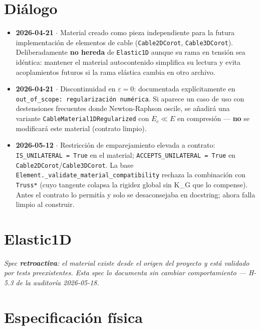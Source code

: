 \documentclass[11pt,letterpaper,oneside]{report}
\begin{document}
\section{Diálogo}

\begin{itemize}
  \item \textbf{2026-04-21} \ensuremath{\cdot} Material creado como pieza independiente para la futura implementación de elementos de cable (\texttt{Cable2DCorot}, \texttt{Cable3DCorot}). Deliberadamente \textbf{no hereda} de \texttt{Elastic1D} aunque su rama en tensión sea idéntica: mantener el material autocontenido simplifica su lectura y evita acoplamientos futuros si la rama elástica cambia en otro archivo.
  \item \textbf{2026-04-21} \ensuremath{\cdot} Discontinuidad en $\varepsilon = 0$: documentada explícitamente en \texttt{out\_of\_scope: regularización numérica}. Si aparece un caso de uso con destensiones frecuentes donde Newton-Raphson oscile, se añadirá una variante \texttt{CableMaterial1DRegularized} con $E_c \ll E$ en compresión --- \textbf{no} se modificará este material (contrato limpio).
  \item \textbf{2026-05-12} \ensuremath{\cdot} Restricción de emparejamiento elevada a contrato: \texttt{IS\_UNILATERAL = True} en el material; \texttt{ACCEPTS\_UNILATERAL = True} en \texttt{Cable2DCorot}/\texttt{Cable3DCorot}. La base \texttt{Element.\_validate\_material\_compatibility} rechaza la combinación con \texttt{Truss*} (cuyo tangente colapsa la rigidez global sin K\_G que lo compense). Antes el contrato lo permitía y solo se desaconsejaba en docstring; ahora falla limpio al construir.
\end{itemize}


\newpage

\section{Elastic1D}



\textit{Spec \textbf{retroactiva}: el material existe desde el origen del proyecto y está validado por tests preexistentes. Esta spec lo documenta sin cambiar comportamiento --- H-5.3 de la auditoría 2026-05-18.}



\section{Especificación física}
\end{document}
